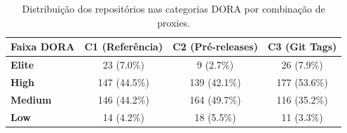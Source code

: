 \begin{table}[ht]
\centering
\caption{Distribuição dos repositórios nas categorias DORA por combinação de proxies.}
\label{tab:rq07_distribuicao_tiers}
\small
\begin{tabular}{lccc}
\toprule
\textbf{Faixa DORA} & \textbf{C1 (Referência)} & \textbf{C2 (Pré-releases)} & \textbf{C3 (Git Tags)} \\
\midrule
\textbf{Elite} & 23 (7.0\%) & 9 (2.7\%) & 26 (7.9\%) \\
\textbf{High} & 147 (44.5\%) & 139 (42.1\%) & 177 (53.6\%) \\
\textbf{Medium} & 146 (44.2\%) & 164 (49.7\%) & 116 (35.2\%) \\
\textbf{Low} & 14 (4.2\%) & 18 (5.5\%) & 11 (3.3\%) \\
\bottomrule
\end{tabular}
\end{table}